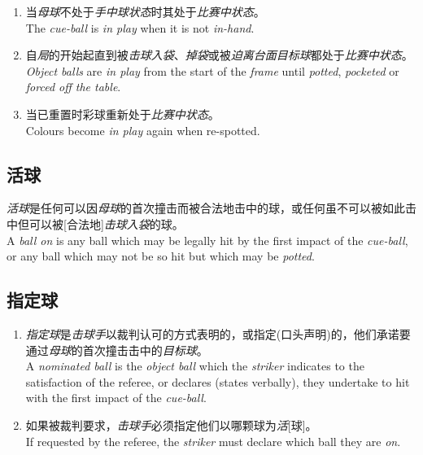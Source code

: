 \begin{enumerate}[label=(\alph*)]
    \item 当\emph{母球}不处于\emph{手中球状态}时其处于\emph{比赛中状态}。\\
    The \emph{cue-ball} is \emph{in play} when it is not \emph{in-hand}.
    \item 自\emph{局}的开始起直到被\emph{击球入袋}、\emph{掉袋}或被\emph{迫离台面}\emph{目标球}都处于\emph{比赛中状态}。\\
    \emph{Object balls} are \emph{in play} from the start of the \emph{frame} until \emph{potted}, \emph{pocketed} or \emph{forced off the table}.
    \item 当已重置时彩球重新处于\emph{比赛中状态}。\\
    Colours become \emph{in play} again when re-spotted.
\end{enumerate}

\subsection{活球}

\noindent \emph{活球}是任何可以因\emph{母球}的首次撞击而被合法地击中的球，或任何虽不可以被如此击中但可以被[合法地]\emph{击球入袋}的球。\\
A \emph{ball on} is any ball which may be legally hit by the first impact of the \emph{cue-ball}, or any ball which may not be so hit but which may be \emph{potted}.

\subsection{指定球}

\begin{enumerate}[label=(\alph*)]
    \item \emph{指定球}是\emph{击球手}以裁判认可的方式表明的，或指定(口头声明)的，他们承诺要通过\emph{母球}的首次撞击击中的\emph{目标球}。\\
    A \emph{nominated ball} is the \emph{object ball} which the \emph{striker} indicates to the satisfaction of the referee, or declares (states verbally), they undertake to hit with the first impact of the \emph{cue-ball}.
    \item 如果被裁判要求，\emph{击球手}必须指定他们以哪颗球为\emph{活}[球]。\\
    If requested by the referee, the \emph{striker} must declare which ball they are \emph{on}.
\end{enumerate}

